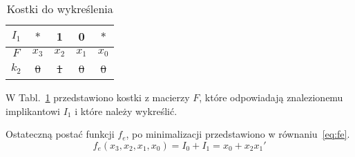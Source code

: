 \begin{table}[H]
    \centering
    \begin{tabular}[t]{ |c|c c c c| }
        \hline
        $I_1$ & $*$ & 1 & 0 & $*$ \\
        \hline\hline
        $F$ & $x_3$ & $x_2$ & $x_1$ & $x_0$ \\
        \hline
        \sout{$k_2$} & \sout{0} & \sout{1} & \sout{0} & \sout{0} \\
        \hline
    \end{tabular}
    \caption{Kostki do wykreślenia}\label{tab:die-1e}
\end{table}
W Tabl.~\ref{tab:die-1e} przedstawiono kostki z macierzy $F$, które odpowiadają znalezionemu implikantowi $I_1$
i które należy wykreślić.

Ostateczną postać funkcji $f_e$, po minimalizacji przedstawiono w równaniu~\ref{eq:fe}.
\begin{equation}
    \label{eq:fe}
    f_e(x_3, x_2, x_1, x_0) = I_0 + I_1 = x_0 + x_{2}x_1'
\end{equation}

